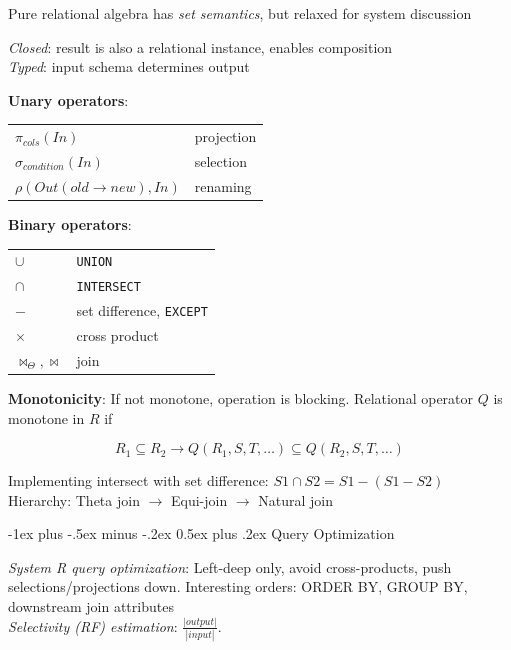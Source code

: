 \documentclass[10pt,landscape]{article}
\makeatletter
\renewcommand{\section}{\@startsection{section}{1}{0mm}%
                                {-1ex plus -.5ex minus -.2ex}%
                                {0.5ex plus .2ex}%
                                {\normalfont\large\bfseries}}
\makeatother
\begin{document}
\begin{multicols}{3}
Pure relational algebra has \textit{set semantics}, but relaxed for system discussion

\textit{Closed}: result is also a relational instance, enables composition \\
\textit{Typed}: input schema determines output

\textbf{Unary operators}:

\begin{tabular}{@{}ll@{}}
$\pi_{cols}(In)$                        & projection \\
$\sigma_{condition}(In)$                & selection \\
$\rho(Out(old \rightarrow new), In)$    & renaming
\end{tabular}

\textbf{Binary operators}:

\begin{tabular}{@{}ll@{}}
$\cup$                      & \texttt{UNION} \\
$\cap$                      & \texttt{INTERSECT} \\
$-$                         & set difference, \texttt{EXCEPT} \\
$\times$                    & cross product \\
$\bowtie_\Theta, \bowtie$   & join
\end{tabular}

\textbf{Monotonicity}: If not monotone, operation is blocking. Relational operator $Q$ is monotone in $R$ if

\begin{equation}
    R_1 \subseteq R_2 \rightarrow Q(R_1, S, T, \ldots) \subseteq Q(R_2, S, T, \ldots)
\end{equation}

Implementing intersect with set difference: $S1 \cap S2  = S1 - (S1 - S2)$ \\
Hierarchy: Theta join $\rightarrow$ Equi-join $\rightarrow$ Natural join


\section{Query Optimization}

\textit{System R query optimization}: Left-deep only, avoid cross-products, push selections/projections down. Interesting orders: ORDER BY, GROUP BY, downstream join attributes \\
\textit{Selectivity (RF) estimation}: $\frac{|output|}{|input|}$.


\end{multicols}
\end{document}
